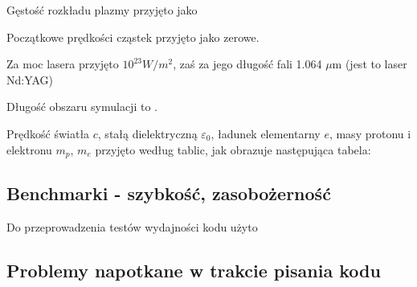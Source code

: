     Gęstość rozkładu plazmy przyjęto jako

    Początkowe prędkości cząstek przyjęto jako zerowe.

    Za moc lasera przyjęto $10^{23} W/m^2$,  zaś za jego długość fali 1.064 $\mu$m (jest to laser Nd:YAG)

    Długość obszaru symulacji to .

    Prędkość światła $c$, stałą dielektryczną $\varepsilon_0$, ładunek
    elementarny $e$, masy protonu i elektronu $m_p$, $m_e$ przyjęto według
    tablic, jak obrazuje następująca tabela:


    \subsection{Benchmarki - szybkość, zasobożerność} 
     Do przeprowadzenia testów wydajności kodu użyto 
    \subsection{Problemy napotkane w trakcie pisania kodu}
